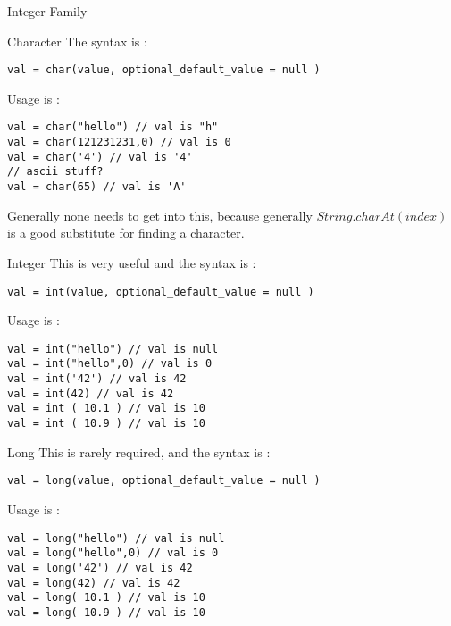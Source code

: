 \begin{section}{Integer Family}
\begin{subsection}{Character}
The syntax is :

\begin{lstlisting}[style=JexlStyle]
val = char(value, optional_default_value = null )
\end{lstlisting}

Usage is :

\begin{lstlisting}[style=JexlStyle]
val = char("hello") // val is "h"
val = char(121231231,0) // val is 0
val = char('4') // val is '4' 
// ascii stuff?
val = char(65) // val is 'A'  
\end{lstlisting}

Generally none needs to get into this, because generally $String.charAt(index)$ is a good substitute
for finding a character.
\end{subsection}

\begin{subsection}{Integer}
This is very useful and the syntax is :

\begin{lstlisting}[style=JexlStyle]
val = int(value, optional_default_value = null )
\end{lstlisting}

Usage is :

\begin{lstlisting}[style=JexlStyle]
val = int("hello") // val is null
val = int("hello",0) // val is 0
val = int('42') // val is 42 
val = int(42) // val is 42 
val = int ( 10.1 ) // val is 10 
val = int ( 10.9 ) // val is 10 
\end{lstlisting}

\end{subsection}


\begin{subsection}{Long}
This is rarely required, and the syntax is :

\begin{lstlisting}[style=JexlStyle]
val = long(value, optional_default_value = null )
\end{lstlisting}

Usage is :

\begin{lstlisting}[style=JexlStyle]
val = long("hello") // val is null
val = long("hello",0) // val is 0
val = long('42') // val is 42 
val = long(42) // val is 42 
val = long( 10.1 ) // val is 10 
val = long( 10.9 ) // val is 10 
\end{lstlisting}

\end{subsection}


\end{section}

